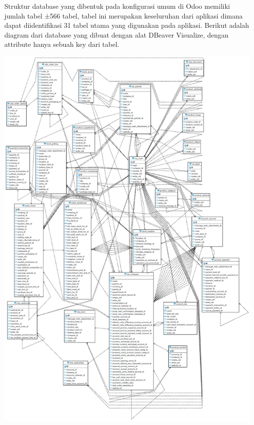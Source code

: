 Struktur database yang dibentuk pada konfigurasi umum di Odoo memiliki jumlah tabel ±566 tabel, tabel ini merupakan keseluruhan dari aplikasi dimana dapat diidentifikasi 31 tabel utama yang digunakan pada aplikasi. Berikut adalah diagram dari database yang dibuat dengan alat DBeaver Visualize, dengan attribute hanya sebuah key dari tabel. \\
\begin{center}
	\includegraphics[width=14cm]{img/DatabaseOdoo.png}
	\label{fig:asd}
\end{center}



